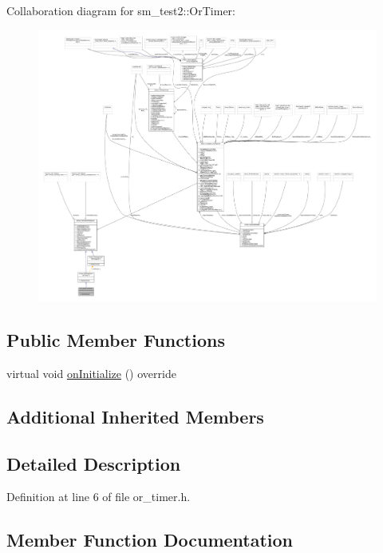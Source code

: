 Collaboration diagram for sm\+\_\+test2\+:\+:Or\+Timer\+:
\nopagebreak
\begin{figure}[H]
\begin{center}
\leavevmode
\includegraphics[width=350pt]{classsm__test2_1_1OrTimer__coll__graph}
\end{center}
\end{figure}
\subsection*{Public Member Functions}
\begin{DoxyCompactItemize}
\item 
virtual void \hyperlink{classsm__test2_1_1OrTimer_a24cef49cf4f0e6d8a9a69121cfe649a6}{on\+Initialize} () override
\end{DoxyCompactItemize}
\subsection*{Additional Inherited Members}


\subsection{Detailed Description}


Definition at line 6 of file or\+\_\+timer.\+h.



\subsection{Member Function Documentation}
\mbox{\label{classsm__test2_1_1OrTimer_a24cef49cf4f0e6d8a9a69121cfe649a6}} 

